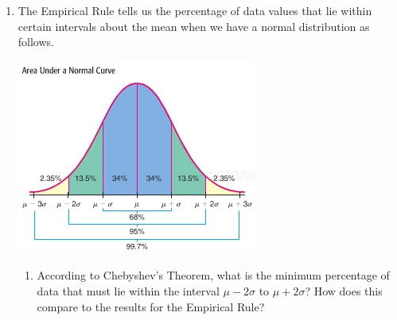 \documentclass{article}
\newcommand{\answer}[1]{\color{red}#1}
\begin{document}
\begin{enumerate}
\begin{enumerate}
	{\answer Since $\mu = 21$, the percentage of the eggs that will hatch at that time or greater is 50\%.  So, that is 500 of the eggs.}
	
	\item between 20 and 21 days? 
	
	{\answer Since $\mu = 21$ and $\sigma =1$, we are looking at the percentage of the eggs in the interval $\mu-\sigma$ to $\mu$ which is 34\%.  So, that is 340 of the eggs.}
	
	\item between 22 and 23 days?
	
	{\answer Since $\mu = 21$ and $\sigma=1$, we are looking at the percentage of eggs in the interval $\mu+\sigma$ and $\mu + 2\sigma$ which is 13.5\%.  So, that is 135 of the eggs.}
	
	\item between 19 and 22 days?
	
	{\answer Since $\mu = 21$ and $\sigma=1$, we are looking at the percentage of eggs in the interval $\mu-2\sigma$ and $\mu + \sigma$ which is 81.5\%.  So, that is 815 of the eggs.}
	
	\end{enumerate}

\newpage

\item The Empirical Rule tells us the percentage of data values that lie within certain intervals about the mean when we have a normal distribution as follows.

\begin{center}
\includegraphics[scale=0.5]{WS10_NormalArea.jpg}
\end{center}

	\begin{enumerate}
	\item According to Chebyshev's Theorem, what is the minimum percentage of data that must lie within the interval $\mu-2\sigma$ to $\mu + 2\sigma$?  How does this compare to the results for the Empirical Rule?
	

\end{enumerate}
\end{enumerate}
\end{document}
